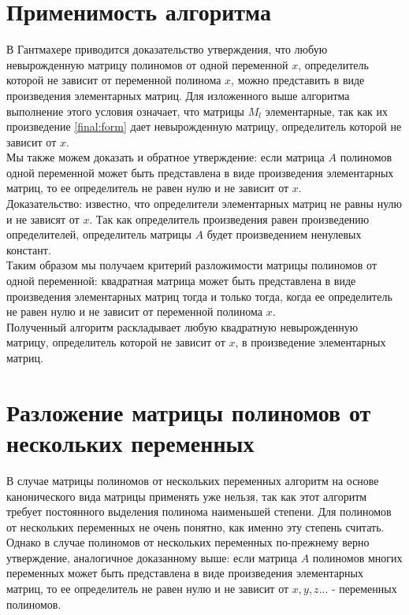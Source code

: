 \documentclass[14pt, a4paper]{extreport}
\begin{document}
	\section{Применимость алгоритма}
	В Гантмахере \cite{gantmaher} приводится доказательство утверждения,
	что любую невырожденную матрицу полиномов от одной переменной $x$,
	определитель которой не зависит от переменной полинома $x$, можно представить
	в виде произведения элементарных матриц. Для изложенного выше алгоритма выполнение этого
	условия означает, что матрицы $M_{l}$ элементарные, так как их произведение \ref{final:form}
	дает невырожденную матрицу, определитель которой не зависит от $x$.\\
	Мы также можем доказать и обратное утверждение: если матрица $A$ полиномов одной переменной может
	быть представлена в виде произведения элементарных матриц, то ее определитель не равен нулю и
	не зависит от $x$.\\
	Доказательство: известно, что определители элементарных матриц не равны нулю и не зависят от $x$.
	Так как определитель произведения равен произведению определителей, определитель матрицы $A$ будет
	произведением ненулевых констант.\\
	Таким образом мы получаем критерий разложимости матрицы полиномов от одной переменной: квадратная матрица может
	быть представлена в виде произведения элементарных матриц тогда и только тогда, когда ее определитель
	не равен нулю и не зависит от переменной полинома $x$.\\
	Полученный алгоритм раскладывает любую квадратную невырожденную матрицу, определитель которой не зависит
	от $x$, в произведение элементарных матриц.

	\section{Разложение матрицы полиномов от нескольких переменных}
	В случае матрицы полиномов от нескольких переменных алгоритм на основе канонического вида матрицы применять уже нельзя,
	так как этот алгоритм требует постоянного выделения полинома наименьшей степени. Для полиномов от нескольких
	переменных не очень понятно, как именно эту степень считать.\\
	Однако в случае полиномов от нескольких переменных по-прежнему верно утверждение, аналогичное доказанному выше:
	если матрица $A$ полиномов многих переменных может
	быть представлена в виде произведения элементарных матриц, то ее определитель не равен нулю и
	не зависит от $x, y, z ...$ - переменных полиномов.
\end{document}
